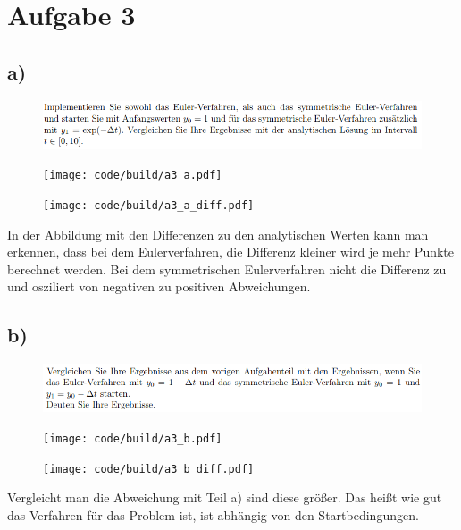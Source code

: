 \FloatBarrier
\section{Aufgabe 3}
\label{sec:A3}
\subsection*{a)}
\begin{figure}
\centering
\includegraphics[width=\textwidth]{bild/a.png}
\end{figure}
\begin{figure}
    \centering
    \texttt{[image: code/build/a3\_a.pdf]}
\end{figure}
\begin{figure}
    \centering
    \texttt{[image: code/build/a3\_a\_diff.pdf]}
\end{figure}
\FloatBarrier
In der Abbildung mit den Differenzen zu den analytischen Werten
kann man erkennen, dass bei dem Eulerverfahren, 
die Differenz kleiner wird je mehr Punkte berechnet werden.
Bei dem symmetrischen Eulerverfahren nicht die Differenz zu und osziliert
von negativen zu positiven Abweichungen.
\FloatBarrier
\subsection*{b)}
\begin{figure}
\centering
\includegraphics[width=\textwidth]{bild/b.png}
\end{figure}
\begin{figure}
    \centering
    \texttt{[image: code/build/a3\_b.pdf]}
\end{figure}
\begin{figure}
    \centering
    \texttt{[image: code/build/a3\_b\_diff.pdf]}
\end{figure}
\FloatBarrier
Vergleicht man die Abweichung mit Teil a) sind diese größer.
Das heißt wie gut das Verfahren für das Problem ist, ist abhängig von den Startbedingungen.
